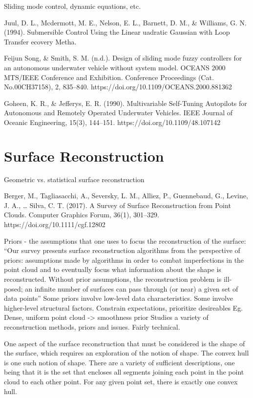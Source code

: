 Sliding mode control, dynamic equations, etc.

\cite{Juul1994}
Juul, D. L., Mcdermott, M. E., Nelson, E. L., Barnett, D. M., \& Williams, G. N. (1994). Submersible Control Using the Linear uadratic Gaussian with Loop Transfer ecovery Metha.

\cite{FeijunSong}
Feijun Song, \& Smith, S. M. (n.d.). Design of sliding mode fuzzy controllers for an autonomous underwater vehicle without system model. OCEANS 2000 MTS/IEEE Conference and Exhibition. Conference Proceedings (Cat. No.00CH37158), 2, 835–840. https://doi.org/10.1109/OCEANS.2000.881362

\cite{Goheen1990}
Goheen, K. R., \& Jefferys, E. R. (1990). Multivariable Self-Tuning Autopilots for Autonomous and Remotely Operated Underwater Vehicles. IEEE Journal of Oceanic Engineering, 15(3), 144–151. https://doi.org/10.1109/48.107142

\section{Surface Reconstruction}

Geometric vs. statistical surface reconstruction

Berger, M., Tagliasacchi, A., Seversky, L. M., Alliez, P., Guennebaud, G., Levine, J. A., … Silva, C. T. (2017). A Survey of Surface Reconstruction from Point Clouds. Computer Graphics Forum, 36(1), 301–329. https://doi.org/10.1111/cgf.12802

Priors - the assumptions that one uses to focus the reconstruction of the surface:
“Our survey presents surface reconstruction algorithms from the perspective of priors: assumptions made by algorithms in order to combat imperfections in the point cloud and to eventually focus what information about the shape is reconstructed. Without prior assumptions, the reconstruction problem is ill-posed; an infinite number of surfaces can pass through (or near) a given set of data points”
Some priors involve low-level data characteristics. Some involve higher-level structural factors.
Constrain expectations, prioritize desireables
Eg. Dense, uniform point cloud -> smoothness prior
Studies a variety of reconstruction methods, priors and issues. 
Fairly technical.


One aspect of the surface reconstruction that must be considered is the shape of the surface, which requires an exploration of the notion of shape. The convex hull is one such notion of shape. There are a variety of sufficient descriptions, one being that it is the set that encloses all segments joining each point in the point cloud to each other point. For any given point set, there is exactly one convex hull.


